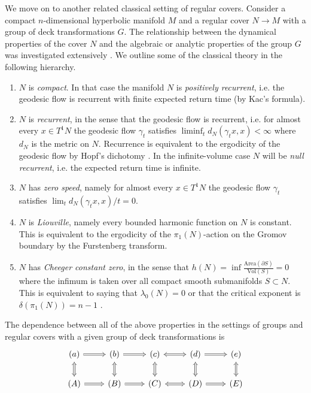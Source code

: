 \documentclass{amsart}
\theoremstyle{plain}
\numberwithin{equation}{section}
\theoremstyle{definition}
\begin{document}
We move on to another related classical setting of  regular covers.
Consider a compact $n$-dimensional hyperbolic manifold $M$ and a regular cover $N \to M$ with a group of deck transformations $G$. The relationship between the dynamical properties of the cover $N$ and the algebraic or analytic properties of the group $G$ was investigated extensively \cite{guivarc1980loi,brooks1981relation,lyons1984function,kaimanovich1986brownian,ledrappier2010linear}. We outline some of the classical theory in the following hierarchy.

\begin{enumerate}[label=(\Alph*),leftmargin=*]
    \item $N$ is \emph{compact}.  In that case the manifold $N$ is \emph{positively recurrent}, i.e. the geodesic flow is recurrent with finite expected return time (by Kac's formula).
    \item $N$ is \emph{recurrent}, in the sense that the geodesic flow is recurrent, i.e. for almost every $x \in T^1N$ the geodesic flow $\gamma_t$ satisfies $\liminf_t d_N(\gamma_tx,x) < \infty$ where $d_N$ is the metric on $N$. Recurrence is equivalent to the ergodicity of the geodesic flow by Hopf's dichotomy \cite{hopf1971ergodic,tsuji1959potential,sullivan1979density}. 
    In the infinite-volume case $N$ will be \emph{null recurrent}, i.e. the expected return time is infinite.
   \item $N$ has \emph{zero speed},  namely for almost every $x \in T^1N$ the geodesic flow $\gamma_t$ satisfies $\lim_t d_N(\gamma_tx,x)/t = 0$.
    
    \item $N$ is \emph{Liouville}, namely every bounded harmonic function on $N$ is constant. This is equivalent to the ergodicity of the $\pi_1(N)$-action on the Gromov boundary by the Furstenberg transform. 

    \item $N$ has \emph{Cheeger constant zero}, in the sense that $h(N)  = \inf \frac{\mathrm{Area}(\partial S)}{\mathrm{Vol}(S)} = 0$ where the infimum is taken over all compact smooth submanifolds $S \subset N$. This is equivalent to saying that $\lambda_0(N) = 0$ \cite{cheeger1970lower,buser1982note} or that the critical exponent is $\delta(\pi_1(N)) = n-1$ \cite{elstrodt1973resolvente, patterson1976limit}. 
\end{enumerate}
The dependence between all of the above properties in the settings of groups and regular covers with a given group of deck transformations is
$$
\begin{tikzcd}
(a) \arrow[r,Rightarrow] \arrow[d,Leftrightarrow] & (b) \arrow[r,Rightarrow] \arrow[d,Leftrightarrow] & (c) \arrow[r,Leftrightarrow] \arrow[d,Leftrightarrow] & (d) \arrow[r,Rightarrow] \arrow[d,Leftrightarrow] & (e) \arrow[d,Leftrightarrow] \\
(A) \arrow[r,Rightarrow] & (B) \arrow[r,Rightarrow] & (C) \arrow[r,Leftrightarrow] & (D) \arrow[r,Rightarrow] & (E)
\end{tikzcd}
$$
\end{document}
